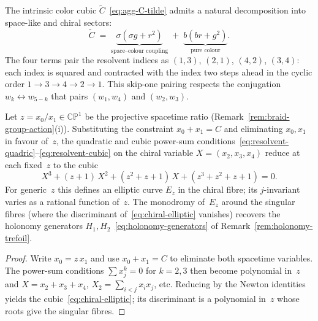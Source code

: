 \begin{remark}
\label{rem:intrinsic-color-cubic-pairing}
  The intrinsic color cubic $\widetilde{C}$~\eqref{eq:agg-C-tilde}
  admits a natural decomposition into space-like and chiral sectors:
  \begin{equation}\label{eq:color-cubic-decomp}
    \widetilde{C}
    \;=\;
    \underbrace{\sigma(\sigma g + r^2)}_{\text{space--colour coupling}}
    \;+\;
    \underbrace{b(br + g^2)}_{\text{pure colour}}.
  \end{equation}
  The four terms pair the resolvent indices as $(1,3)$, $(2,1)$, $(4,2)$,
  $(3,4)$: each index is squared and contracted with the index two steps
  ahead in the cyclic order $1 \to 3 \to 4 \to 2 \to 1$.  This
  skip-one pairing respects the conjugation $w_k \leftrightarrow w_{5-k}$
  that pairs $(w_1, w_4)$ and $(w_2, w_3)$.
\end{remark}

\begin{proposition}
\label{prop:chiral-elliptic}
Let $z=x_0/x_1\in\mathbb{CP}^1$ be the projective spacetime ratio
(Remark~\ref{rem:braid-group-action}\textup{(i)}).  Substituting the
constraint $x_0+x_1=C$ and eliminating $x_0,x_1$ in favour of~$z$,
the quadratic and cubic power-sum
conditions~\eqref{eq:resolvent-quadric}--\eqref{eq:resolvent-cubic} on
the chiral variable $X=(x_2,x_3,x_4)$ reduce at each fixed~$z$ to the
cubic
\begin{equation}\label{eq:chiral-elliptic}
  X^3+(z+1)\,X^2+(z^2+z+1)\,X+(z^3+z^2+z+1)=0.
\end{equation}
For generic~$z$ this defines an elliptic curve $E_z$ in the chiral
fibre; its $j$-invariant varies as a rational function of~$z$.  The
monodromy of~$E_z$ around the singular fibres (where the discriminant
of~\eqref{eq:chiral-elliptic} vanishes) recovers the holonomy
generators $H_1,H_2$~\eqref{eq:holonomy-generators} of
Remark~\ref{rem:holonomy-trefoil}.
\end{proposition}
\begin{proof}
Write $x_0=z\,x_1$ and use $x_0+x_1=C$ to eliminate both spacetime
variables.  The power-sum conditions $\sum x_j^k=0$ for $k=2,3$ then
become polynomial in~$z$ and $X=x_2+x_3+x_4$, $X_2=\sum_{i<j}x_ix_j$,
etc.  Reducing by the Newton identities yields the
cubic~\eqref{eq:chiral-elliptic}; its discriminant is a polynomial
in~$z$ whose roots give the singular fibres.
\end{proof}

